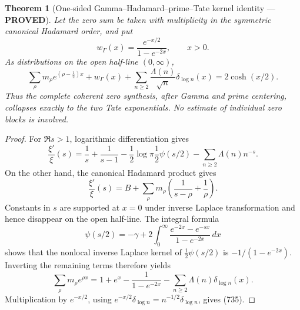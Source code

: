 \documentclass[11pt]{article}
\newtheorem{theorem}{Theorem}
\newcommand{\PROVED}{\textcolor{green!45!black}{\textbf{PROVED}}}
\begin{document}
\begin{theorem}[One-sided Gamma--Hadamard--prime--Tate kernel identity ---
\PROVED]
Let the zero sum be taken with multiplicity in the symmetric canonical
Hadamard order, and put
\[
 w_\Gamma(x)=\frac{e^{-x/2}}{1-e^{-2x}},\qquad x>0.
\]
As distributions on the open half-line \((0,\infty)\),
\begin{equation}
 \boxed{
 \sum_\rho m_\rho e^{(\rho-\frac12)x}
 +w_\Gamma(x)
 +\sum_{n\ge2}\frac{\Lambda(n)}{\sqrt n}
       \delta_{\log n}(x)
 =2\cosh(x/2).}                                    \tag{735}
\end{equation}
Thus the complete coherent zero synthesis, after Gamma and prime
centering, collapses exactly to the two Tate exponentials.  No estimate of
individual zero blocks is involved.
\end{theorem}

\begin{proof}
For \(\Re s>1\), logarithmic differentiation gives
\[
 \frac{\xi'}{\xi}(s)
 =\frac1s+\frac1{s-1}-\frac12\log\pi
  \frac12\psi(s/2)-\sum_{n\ge2}\Lambda(n)n^{-s}.
\]
On the other hand, the canonical Hadamard product gives
\[
 \frac{\xi'}{\xi}(s)
 =B+\sum_\rho m_\rho
   \left(\frac1{s-\rho}+\frac1\rho\right).
\]
Constants in \(s\) are supported at \(x=0\) under inverse Laplace
transformation and hence disappear on the open half-line.  The integral
formula
\[
 \psi(s/2)=-\gamma+
 2\int_0^\infty
 \frac{e^{-2x}-e^{-sx}}{1-e^{-2x}}\,dx
\]
shows that the nonlocal inverse Laplace kernel of
\(\frac12\psi(s/2)\) is \(-1/(1-e^{-2x})\).  Inverting the remaining terms
therefore yields
\[
 \sum_\rho m_\rho e^{\rho x}
 =1+e^x-\frac1{1-e^{-2x}}
  -\sum_{n\ge2}\Lambda(n)\delta_{\log n}(x).
\]
Multiplication by \(e^{-x/2}\), using
\(e^{-x/2}\delta_{\log n}=n^{-1/2}\delta_{\log n}\), gives (735).
\end{proof}
\end{document}
